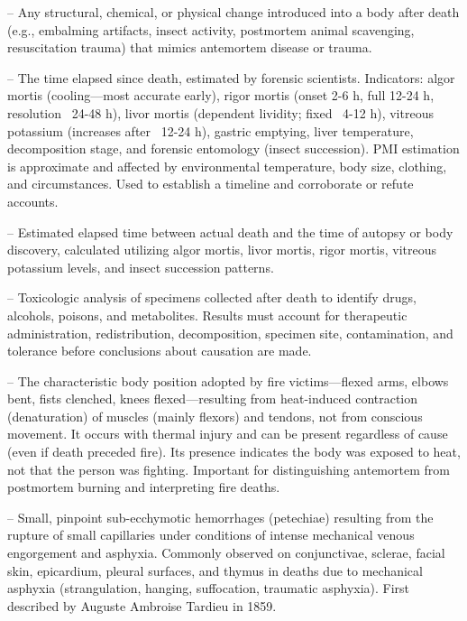 -- Any structural, chemical, or physical change introduced into a body after death (e.g., embalming artifacts, insect activity, postmortem animal scavenging, resuscitation trauma) that mimics antemortem disease or trauma.

-- The time elapsed since death, estimated by forensic scientists. Indicators: algor mortis (cooling—most accurate early), rigor mortis (onset 2-6 h, full 12-24 h, resolution ~24-48 h), livor mortis (dependent lividity; fixed ~4-12 h), vitreous potassium (increases after ~12-24 h), gastric emptying, liver temperature, decomposition stage, and forensic entomology (insect succession). PMI estimation is approximate and affected by environmental temperature, body size, clothing, and circumstances. Used to establish a timeline and corroborate or refute accounts.

-- Estimated elapsed time between actual death and the time of autopsy or body discovery, calculated utilizing algor mortis, livor mortis, rigor mortis, vitreous potassium levels, and insect succession patterns.

-- Toxicologic analysis of specimens collected after death to identify drugs, alcohols, poisons, and metabolites. Results must account for therapeutic administration, redistribution, decomposition, specimen site, contamination, and tolerance before conclusions about causation are made.


-- The characteristic body position adopted by fire victims—flexed arms, elbows bent, fists clenched, knees flexed—resulting from heat-induced contraction (denaturation) of muscles (mainly flexors) and tendons, not from conscious movement. It occurs with thermal injury and can be present regardless of cause (even if death preceded fire). Its presence indicates the body was exposed to heat, not that the person was fighting. Important for distinguishing antemortem from postmortem burning and interpreting fire deaths.

-- Small, pinpoint sub-ecchymotic hemorrhages (petechiae) resulting from the rupture of small capillaries under conditions of intense mechanical venous engorgement and asphyxia. Commonly observed on conjunctivae, sclerae, facial skin, epicardium, pleural surfaces, and thymus in deaths due to mechanical asphyxia (strangulation, hanging, suffocation, traumatic asphyxia). First described by Auguste Ambroise Tardieu in 1859.

